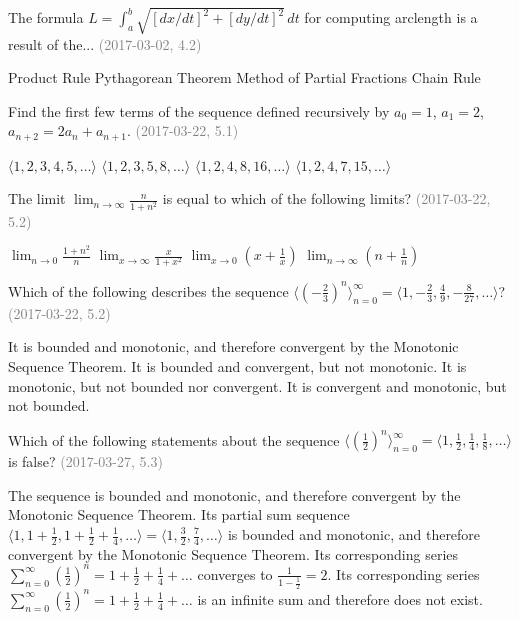 \documentclass[12pt]{exam}
\newcommand{\questionDate}[1]{\textcolor{gray}{(#1)}}
\newcommand{\<}{\langle}
\renewcommand{\>}{\rangle}
\begin{document}
\begin{questions}
  \question
  The formula \(L=\int_a^b\sqrt{[dx/dt]^2+[dy/dt]^2}\,dt\) for computing
  arclength is a result of the...
  \questionDate{2017-03-02, 4.2}
  \begin{choices}
    \choice
      Product Rule
    \CorrectChoice
      Pythagorean Theorem
    \choice
      Method of Partial Fractions
    \choice
      Chain Rule
  \end{choices}

\newpage

  \question
  Find the first few terms of the sequence defined recursively by
  \(a_0=1\), \(a_1=2\), \(a_{n+2}=2a_n+a_{n+1}\).
  \questionDate{2017-03-22, 5.1}
  \begin{choices}
    \choice
      \(\<1,2,3,4,5,\dots\>\)
    \choice
      \(\<1,2,3,5,8,\dots\>\)
    \CorrectChoice
      \(\<1,2,4,8,16,\dots\>\)
    \choice
      \(\<1,2,4,7,15,\dots\>\)
  \end{choices}

  \question
  The limit \(\displaystyle\lim_{n\to\infty}\frac{n}{1+n^2}\) is equal to
  which of the following limits?
  \questionDate{2017-03-22, 5.2}
  \begin{choices}
    \choice
      \(\displaystyle\lim_{n\to 0}\frac{1+n^2}{n}\)
    \CorrectChoice
      \(\displaystyle\lim_{x\to\infty}\frac{x}{1+x^2}\)
    \choice
      \(\displaystyle\lim_{x\to 0} \left(x+\frac{1}{x}\right)\)
    \choice
      \(\displaystyle\lim_{n\to\infty}\left(n+\frac{1}{n}\right)\)
  \end{choices}

  \question
  Which of the following describes the sequence
  \(
    \<(-\frac{2}{3})^n\>_{n=0}^\infty
  =
    \<1,-\frac{2}{3},\frac{4}{9},-\frac{8}{27},\dots\>
  \)?
  \questionDate{2017-03-22, 5.2}
  \begin{choices}
    \choice
      It is bounded and monotonic, and therefore convergent
      by the Monotonic Sequence Theorem.
    \CorrectChoice
      It is bounded and convergent, but not monotonic.
    \choice
      It is monotonic, but not bounded nor convergent.
    \choice
      It is convergent and monotonic, but not bounded.
  \end{choices}


\newpage

\question
Which of the following statements about the sequence
\(\<(\frac{1}{2})^n\>_{n=0}^\infty =
\<1,\frac{1}{2},\frac{1}{4},\frac{1}{8},\dots\>\) is false?
\questionDate{2017-03-27, 5.3}
\begin{choices}
  \choice
    The sequence is bounded and monotonic, and therefore convergent
    by the Monotonic Sequence Theorem.
  \choice
    Its partial sum sequence
    \(\<1,1+\frac{1}{2},1+\frac{1}{2}+\frac{1}{4},\dots\>=
    \<1,\frac{3}{2},\frac{7}{4},\dots\>\) is bounded and monotonic, and
    therefore convergent by the Monotonic Sequence Theorem.
  \choice
    Its corresponding series
    \(\sum_{n=0}^\infty (\frac{1}{2})^n=1+\frac{1}{2}+\frac{1}{4}+\dots\)
    converges to \(\frac{1}{1-\frac{1}{2}}=2\).
  \CorrectChoice
    Its corresponding series
    \(\sum_{n=0}^\infty (\frac{1}{2})^n=1+\frac{1}{2}+\frac{1}{4}+\dots\)
    is an infinite sum and therefore does not exist.
\end{choices}


\end{questions}
\end{document}

